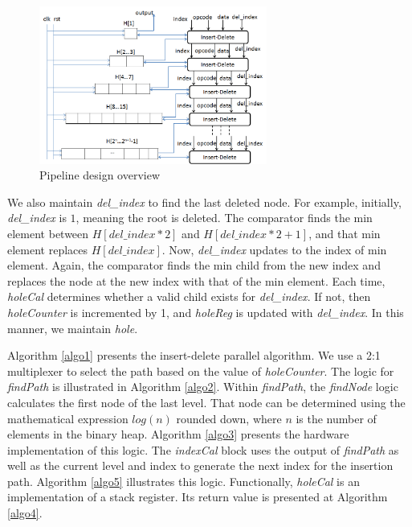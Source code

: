 \begin{figure}[!ht]
  \centering
  \includegraphics[width=7.5cm]{fig/1.png}
      \caption{Pipeline design overview}
    \label{fig11}
\end{figure}

We also maintain {\it del\_index} to find the last deleted node.
For example, initially, {\it del\_index} is $1$, meaning the root is deleted.
The comparator finds the min element between $H[del\_index*2]$ and $H[del\_index*2 + 1]$, and that min element replaces $H[del\_index]$.
Now, {\it del\_index} updates to the index of min element.
Again, the comparator finds the min child from the new index and replaces the node at the new index with that of the min element.
Each time, {\it holeCal} determines whether a valid child exists for {\it del\_index}.
If not, then {\it holeCounter} is incremented by 1, and {\it holeReg} is updated with {\it del\_index}.
In this manner, we maintain {\it hole}.

Algorithm \ref{algo1} presents the insert-delete parallel algorithm.
We use a 2:1 multiplexer to select the path based on the value of {\it holeCounter}.
The logic for {\it findPath} is illustrated in Algorithm \ref{algo2}.
Within {\it findPath}, the {\it findNode} logic calculates the first node of the last level.
That node can be determined using the mathematical expression $log(n)$ rounded down, where $n$ is the number of elements in the binary heap.
Algorithm \ref{algo3} presents the hardware implementation of this logic.
The {\it indexCal} block uses the output of {\it findPath} as well as the current level and index to generate the next index for the insertion path. Algorithm \ref{algo5} illustrates this logic.
Functionally, {\it holeCal} is an implementation of a stack register. Its return value is presented at Algorithm \ref{algo4}.

